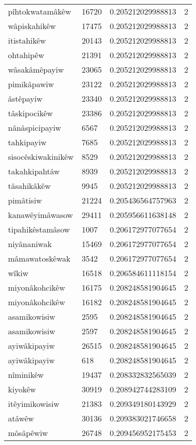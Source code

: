 \begin{longtable}{llll}
pîhtokwatamâkêw & 16720 & 0.205212029988813 & 2 \\
wâpiskahikêw & 17475 & 0.205212029988813 & 2 \\
itistahikêw & 20143 & 0.205212029988813 & 2 \\
ohtahipêw & 21391 & 0.205212029988813 & 2 \\
wâsakâmêpayiw & 23065 & 0.205212029988813 & 2 \\
pimikâpawiw & 23122 & 0.205212029988813 & 2 \\
âstêpayiw & 23340 & 0.205212029988813 & 2 \\
tâskipocikêw & 23386 & 0.205212029988813 & 2 \\
nânâspicipayiw & 6567 & 0.205212029988813 & 2 \\
tahkipayiw & 7685 & 0.205212029988813 & 2 \\
sisocêskiwakinikêw & 8529 & 0.205212029988813 & 2 \\
takahkipahtâw & 8939 & 0.205212029988813 & 2 \\
tâsahikâkêw & 9945 & 0.205212029988813 & 2 \\
pimâtisiw & 21224 & 0.205436564757963 & 2 \\
kanawêyimâwasow & 29411 & 0.205956611638148 & 2 \\
tipahikêstamâsow & 1007 & 0.206172977077654 & 2 \\
niyânaniwak & 15469 & 0.206172977077654 & 2 \\
mâmawatoskêwak & 3542 & 0.206172977077654 & 2 \\
wîkiw & 16518 & 0.206584611118154 & 2 \\
miyonâkohcikêw & 16175 & 0.208248581904645 & 2 \\
miyonâkohcikêw & 16182 & 0.208248581904645 & 2 \\
asamikowisiw & 2595 & 0.208248581904645 & 2 \\
asamikowisiw & 2597 & 0.208248581904645 & 2 \\
ayiwâkipayiw & 26515 & 0.208248581904645 & 2 \\
ayiwâkipayiw & 618 & 0.208248581904645 & 2 \\
nîminikêw & 19437 & 0.208332832565039 & 2 \\
kiyokêw & 30919 & 0.208942744283109 & 2 \\
itêyimikowisiw & 21383 & 0.209349180143929 & 2 \\
atâwêw & 30136 & 0.209383021746658 & 2 \\
môsâpêwiw & 26748 & 0.209456952175453 & 2 \\

\end{longtable}
